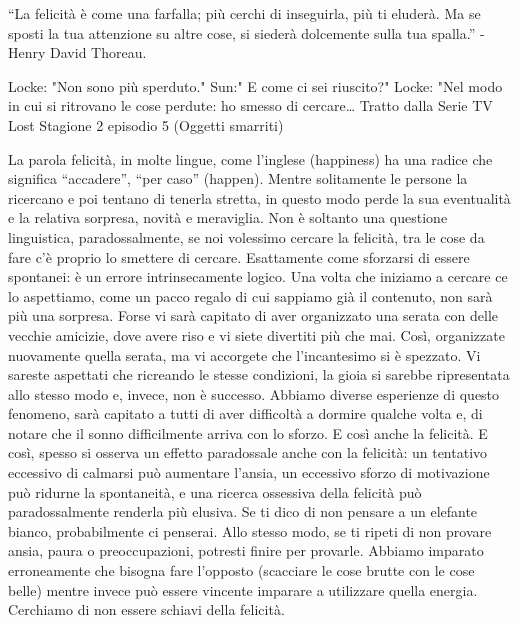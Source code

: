 \documentclass[12pt]{book} %
\begin{document}
“La felicità è come una farfalla; più cerchi di inseguirla, più ti eluderà. Ma se sposti la tua attenzione su altre
cose, si siederà dolcemente sulla tua spalla.” - Henry David Thoreau.

Locke: "Non sono più sperduto." 
Sun:" E come ci sei riuscito?" 
Locke: "Nel modo in cui si ritrovano le cose perdute: ho smesso di cercare…
Tratto dalla Serie TV Lost Stagione 2 episodio 5 (Oggetti smarriti)

La parola felicità, in molte lingue, come l'inglese (happiness) ha una radice che significa
“accadere”, “per caso” (happen). Mentre solitamente le persone la ricercano e poi tentano di tenerla stretta, in questo
modo perde la sua eventualità e la relativa sorpresa, novità e meraviglia. Non è soltanto una questione linguistica,
paradossalmente, se noi volessimo cercare la felicità, tra le cose da fare c'è proprio lo smettere di cercare.
Esattamente come sforzarsi di essere spontanei: è un errore intrinsecamente logico. Una volta che iniziamo a cercare ce
lo aspettiamo, come un pacco regalo di cui sappiamo già il contenuto, non sarà più una sorpresa. Forse vi sarà
capitato di aver organizzato una serata con delle vecchie amicizie, dove avere riso e vi siete divertiti più che mai.
Così, organizzate nuovamente quella serata, ma vi accorgete che l'incantesimo si è spezzato. Vi
sareste aspettati che ricreando le stesse condizioni, la gioia si sarebbe ripresentata allo stesso modo e, invece, non
è successo. Abbiamo diverse esperienze di questo fenomeno, sarà capitato a tutti di aver difficoltà a dormire qualche volta e, di notare che il sonno difficilmente arriva con lo sforzo. E così anche la felicità. 
E così, spesso si osserva un effetto paradossale anche con la felicità: un tentativo eccessivo di calmarsi può aumentare l'ansia, un eccessivo sforzo di motivazione può ridurne la spontaneità, e una ricerca ossessiva della felicità può paradossalmente renderla più elusiva.
Se ti dico di non pensare a un elefante bianco, probabilmente ci penserai. Allo stesso modo, se ti ripeti di non provare ansia, paura o preoccupazioni, potresti finire per provarle. Abbiamo imparato erroneamente che bisogna fare l'opposto (scacciare le cose brutte con le cose belle) mentre invece può essere vincente imparare a utilizzare quella energia.
Cerchiamo di non essere schiavi della felicità.
\end{document}
